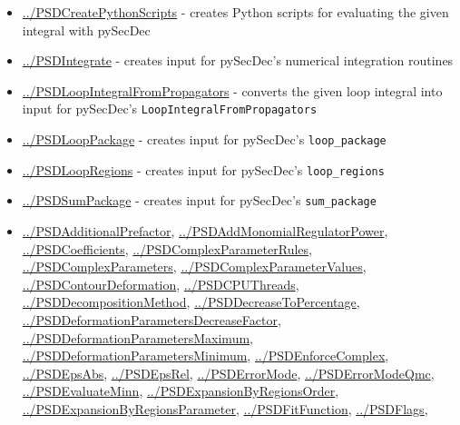 \documentclass[../FeynHelpersManual.tex]{subfiles}
\begin{document}
\begin{itemize}
\tightlist
\item
  \hyperlink{../psdcreatepythonscripts}{../PSDCreatePythonScripts} -
  creates Python scripts for evaluating the given integral with pySecDec
\item
  \hyperlink{../psdintegrate}{../PSDIntegrate} - creates input for
  pySecDec's numerical integration routines
\item
  \hyperlink{../psdloopintegralfrompropagators}{../PSDLoopIntegralFromPropagators}
  - converts the given loop integral into input for pySecDec's
  \texttt{LoopIntegralFromPropagators}
\item
  \hyperlink{../psdlooppackage}{../PSDLoopPackage} - creates input for
  pySecDec's \texttt{loop_package}
\item
  \hyperlink{../psdloopregions}{../PSDLoopRegions} - creates input for
  pySecDec's \texttt{loop_regions}
\item
  \hyperlink{../psdsumpackage}{../PSDSumPackage} - creates input for
  pySecDec's \texttt{sum_package}
\item
  \hyperlink{../psdadditionalprefactor}{../PSDAdditionalPrefactor},
  \hyperlink{../psdaddmonomialregulatorpower}{../PSDAddMonomialRegulatorPower},
  \hyperlink{../psdcoefficients}{../PSDCoefficients},
  \hyperlink{../psdcomplexparameterrules}{../PSDComplexParameterRules},
  \hyperlink{../psdcomplexparameters}{../PSDComplexParameters},
  \hyperlink{../psdcomplexparametervalues}{../PSDComplexParameterValues},
  \hyperlink{../psdcontourdeformation}{../PSDContourDeformation},
  \hyperlink{../psdcputhreads}{../PSDCPUThreads},
  \hyperlink{../psddecompositionmethod}{../PSDDecompositionMethod},
  \hyperlink{../psddecreasetopercentage}{../PSDDecreaseToPercentage},
  \hyperlink{../psddeformationparametersdecreasefactor}{../PSDDeformationParametersDecreaseFactor},
  \hyperlink{../psddeformationparametersmaximum}{../PSDDeformationParametersMaximum},
  \hyperlink{../psddeformationparametersminimum}{../PSDDeformationParametersMinimum},
  \hyperlink{../psdenforcecomplex}{../PSDEnforceComplex},
  \hyperlink{../psdepsabs}{../PSDEpsAbs},
  \hyperlink{../psdepsrel}{../PSDEpsRel},
  \hyperlink{../psderrormode}{../PSDErrorMode},
  \hyperlink{../psderrormodeqmc}{../PSDErrorModeQmc},
  \hyperlink{../psdevaluateminn}{../PSDEvaluateMinn},
  \hyperlink{../psdexpansionbyregionsorder}{../PSDExpansionByRegionsOrder},
  \hyperlink{../psdexpansionbyregionsparameter}{../PSDExpansionByRegionsParameter},
  \hyperlink{../psdfitfunction}{../PSDFitFunction},
  \hyperlink{../psdflags}{../PSDFlags},

\end{itemize}
\end{document}
